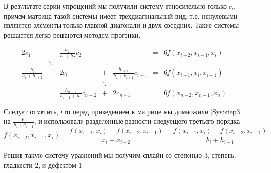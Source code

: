 В результате серии упрощений мы получили систему относительно только $c_i$, причем матрица такой системы имеет трехдиагональный вид, т.е. ненулевыми являются элементы только главной диагонали и двух соседних. Такие системы решаются легко решаются методом прогонки.

\begingroup
\Large
\begin{equation*}
\begin{array}{cccccccr}
2c_{1} & + & \frac{h_2}{h_1+h_2} c_2 & & & = & 6f(x_{i-2}, x_{i-1}, x_i) \\
 & \ddots & & & & & & \\
\frac{h_i} {h_i + h_{i+1}} & + & 2 c_i & + & \frac{h_{i+1}}{h_i + h_{i+1}} c_{i+1} & = & 6f(x_{i-1}, x_i, x_{i+1}) \\
 & & & \ddots & & & & \\
 & & \frac{h_{n-1}}{h_{n-1} + h_{n}} c_{n-2} & + & 2c_{n-1} & = & 6f(x_{n-2}, x_{n-1}, x_n)
\end{array}
\end{equation*}
\endgroup

Следует отметить, что перед приведением к матрице мы домножили \eqref{Sys:step3} на $\frac{6} {h_i +h_{i-1}}$, и использовали разделенные разности следуещего третьего порядка $$f(x_{i-2},x_{i-1},x_i) = \frac{f(x_{i-1}, x_i) - f(x_{i-2}, x_{i-1})}{x_i - x_{i-2}}= \frac{f(x_{i-1}, x_i) - f(x_{i-2}, x_{i-1})}{h_i + h_{i-1}}$$

Решив такую систему уравнений мы получим сплайн со степенью $3$, степень. гладкости $2$, и дефектом $1$